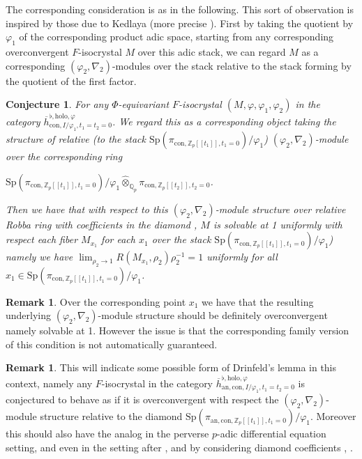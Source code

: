 \documentclass[11pt]{book}
\newtheorem{conjecture}[theorem]{Conjecture}
\theoremstyle{definition}
\newtheorem{remark}[theorem]{Remark}
\numberwithin{equation}{section}
\begin{document}
\indent The corresponding consideration is as in the following. This sort of observation is inspired by those due to Kedlaya \cite{Ked10} (more precise \cite[Chapter 6]{Ked10}). First by taking the quotient by $\varphi_1$ of the corresponding product adic space, starting from any corresponding overconvergent $F$-isocrystal $M$ over this adic stack, we can regard $M$ as a corresponding $(\varphi_2,\nabla_2)$-modules over the stack relative to the stack forming by the quotient of the first factor.


\begin{conjecture}
For any $\Phi$-equivariant $F$-isocrystal $(M,\varphi,\varphi_1,\varphi_2)$ in the category $\overline{h}_{\mathrm{con},I/\varphi_1,t_1=t_2=0}^{\flat,\mathrm{holo},\varphi}$. We regard this as a corresponding object taking the structure of relative (to the stack $\mathrm{Sp}(\pi_{\mathrm{con},\mathbb{Z}_p[[t_1]],t_1=0})/\varphi_1$)	$(\varphi_2,\nabla_2)$-module over the corresponding ring
\begin{center}
 $\mathrm{Sp}(\pi_{\mathrm{con},\mathbb{Z}_p[[t_1]],t_1=0})/\varphi_1\widehat{\otimes}_{\mathbb{Q}_p}\pi_{\mathrm{con},\mathbb{Z}_p[[t_2]],t_2=0}$. 
\end{center}
Then we have that with respect to this $(\varphi_2,\nabla_2)$-module structure over relative Robba ring with coefficients in the diamond \cite{Sch}, $M$ is solvable at 1 uniformly with respect each fiber $M_{x_1}$ for each $x_1$ over the stack $\mathrm{Sp}(\pi_{\mathrm{con},\mathbb{Z}_p[[t_1]],t_1=0})/\varphi_1$) namely we have $\lim_{\rho_2\rightarrow 1}R(M_{x_1},\rho_2)\rho_2^{-1}=1$ uniformly for all $x_1\in \mathrm{Sp}(\pi_{\mathrm{con},\mathbb{Z}_p[[t_1]],t_1=0})/\varphi_1$.
\end{conjecture}


\begin{remark}
Over the corresponding point $x_1$ we have that the resulting underlying $(\varphi_2,\nabla_2)$-module structure should be definitely overconvergent namely solvable at 1.	However the issue is that the corresponding family version of this condition is not automatically guaranteed.
\end{remark}



\begin{remark}
This will indicate some possible form of Drinfeld's lemma in this context, namely any $F$-isocrystal in the category $\overline{h}_{\mathrm{an,con},I/\varphi_1,t_1=t_2=0}^{\flat,\mathrm{holo},\varphi}$ is conjectured to behave as if it is overconvergent with respect the $(\varphi_2,\nabla_2)$-module structure relative to the diamond $\mathrm{Sp}(\pi_{\mathrm{an},\mathrm{con},\mathbb{Z}_p[[t_1]],t_1=0})/\varphi_1$. Moreover this should also have the analog in the perverse $p$-adic differential equation setting, and even in the setting after \cite{CKZ}, \cite{KL1} and \cite{KL2} by considering diamond coefficients \cite{Sch}, \cite{SW}. 
\end{remark}
\end{document}
